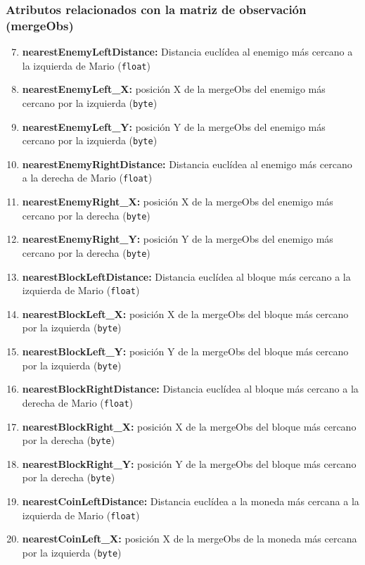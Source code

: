 \documentclass[10pt, spanish, pdftex]{../.template/template}
\begin{document}
    \subsubsection{Atributos relacionados con la matriz de observación (mergeObs)}
    \begin{enumerate}
        \setcounter{enumi}{6}
        \item \textbf{nearestEnemyLeftDistance:} Distancia euclídea al enemigo más cercano a la izquierda de Mario (\texttt{float})
        \item \textbf{nearestEnemyLeft\_X:} posición X de la mergeObs del enemigo más cercano por la izquierda (\texttt{byte})
        \item \textbf{nearestEnemyLeft\_Y:} posición Y de la mergeObs del enemigo más cercano por la izquierda (\texttt{byte})
        \item \textbf{nearestEnemyRightDistance:} Distancia euclídea al enemigo más cercano a la derecha de Mario (\texttt{float})
        \item \textbf{nearestEnemyRight\_X:} posición X de la mergeObs del enemigo más cercano por la derecha (\texttt{byte})
        \item \textbf{nearestEnemyRight\_Y:} posición Y de la mergeObs del enemigo más cercano por la derecha (\texttt{byte})
        \item \textbf{nearestBlockLeftDistance:} Distancia euclídea al bloque más cercano a la izquierda de Mario (\texttt{float})
        \item \textbf{nearestBlockLeft\_X:} posición X de la mergeObs del bloque más cercano por la izquierda (\texttt{byte})
        \item \textbf{nearestBlockLeft\_Y:} posición Y de la mergeObs del bloque más cercano por la izquierda (\texttt{byte})
        \item \textbf{nearestBlockRightDistance:} Distancia euclídea al bloque más cercano a la derecha de Mario (\texttt{float})
        \item \textbf{nearestBlockRight\_X:} posición X de la mergeObs del bloque más cercano por la derecha (\texttt{byte})
        \item \textbf{nearestBlockRight\_Y:} posición Y de la mergeObs del bloque más cercano por la derecha (\texttt{byte})
        \item \textbf{nearestCoinLeftDistance:} Distancia euclídea a la moneda más cercana a la izquierda de Mario (\texttt{float})
        \item \textbf{nearestCoinLeft\_X:} posición X de la mergeObs de la moneda más cercana por la izquierda (\texttt{byte})

\end{enumerate}
\end{document}
